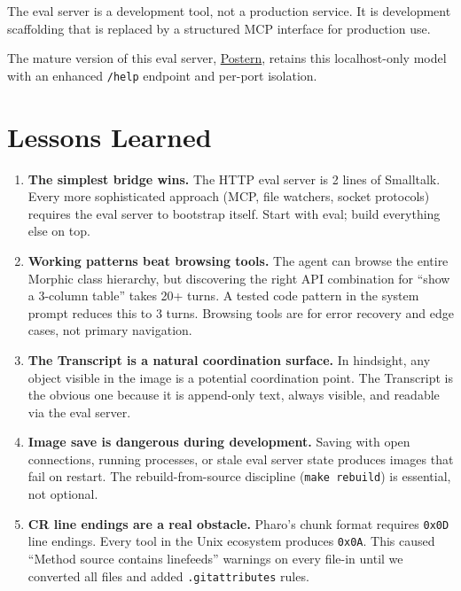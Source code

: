 \documentclass[a4paper,10pt,fleqn]{article}
\begin{document}
The eval server is a development tool, not a production service.  It is development
scaffolding that is replaced by a structured MCP interface for production use.

The mature version of this eval server,
\href{https://github.com/punt-labs/postern}{Postern}, retains this
localhost-only model with an enhanced \texttt{/help} endpoint and
per-port isolation.

\section{Lessons Learned}

\begin{enumerate}[label=\textbf{L\arabic*}.]
  \item \textbf{The simplest bridge wins.}  The HTTP eval server is 2
    lines of Smalltalk.  Every more sophisticated approach (MCP, file
    watchers, socket protocols) requires the eval server to bootstrap
    itself.  Start with eval; build everything else on top.

  \item \textbf{Working patterns beat browsing tools.}  The agent can
    browse the entire Morphic class hierarchy, but discovering the right
    API combination for ``show a 3-column table'' takes 20+ turns.  A
    tested code pattern in the system prompt reduces this to 3 turns.
    Browsing tools are for error recovery and edge cases, not primary
    navigation.

  \item \textbf{The Transcript is a natural coordination surface.}  In
    hindsight, any object visible in the image is a potential
    coordination point.  The Transcript is the obvious one because it is
    append-only text, always visible, and readable via the eval server.

  \item \textbf{Image save is dangerous during development.}  Saving
    with open connections, running processes, or stale eval server state
    produces images that fail on restart.  The rebuild-from-source
    discipline (\texttt{make rebuild}) is essential, not optional.

  \item \textbf{CR line endings are a real obstacle.}  Pharo's chunk
    format requires \texttt{0x0D} line endings.  Every tool in the Unix
    ecosystem produces \texttt{0x0A}.  This caused ``Method source
    contains linefeeds'' warnings on every file-in until we converted
    all files and added \texttt{.gitattributes} rules.


\end{enumerate}
\end{document}
